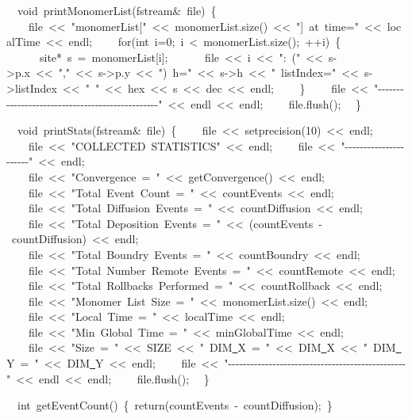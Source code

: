 {\ \ void\ printMonomerList(fstream\&\ file)\ \{
\ \ \ \ file\ <{}<{}\ "{}monomerList["{}\ <{}<{}\ monomerList.size()\ <{}<{}\ "{}]\ at\ time="{}\ <{}<{}\ localTime\ <{}<{}\ endl;
\ \ \ \ for(int\ i=0;\ i\ <{}\ monomerList.size();\ ++i)\ \{
\ \ \ \ \ \ site*\ s\ =\ monomerList[i];
\ \ \ \ \ \ file\ <{}<{}\ i\ <{}<{}\ "{}:\ ("{}\ <{}<{}\ s-{}>{}p.x\ <{}<{}\ "{},"{}\ <{}<{}\ s-{}>{}p.y\ <{}<{}\ "{})\ h="{}\ <{}<{}\ s-{}>{}h\ <{}<{}\ "{}\ listIndex="{}\ <{}<{}\ s-{}>{}listIndex\ <{}<{}\ "{}\ "{}\ <{}<{}\ hex\ <{}<{}\ s\ <{}<{}\ dec\ <{}<{}\ endl;
\ \ \ \ \}
\ \ \ \ file\ <{}<{}\ "{}-{}-{}-{}-{}-{}-{}-{}-{}-{}-{}-{}-{}-{}-{}-{}-{}-{}-{}-{}-{}-{}-{}-{}-{}-{}-{}-{}-{}-{}-{}-{}-{}-{}-{}-{}-{}-{}-{}-{}-{}-{}-{}-{}-{}-{}-{}-{}-{}"{}\ <{}<{}\ endl\ <{}<{}\ endl;
\ \ \ \ file.flush();
\ \ \}

\ \ void\ printStats(fstream\&\ file)\ \{
\ \ \ \ file\ <{}<{}\ setprecision(10)\ <{}<{}\ endl;
\ \ \ \ file\ <{}<{}\ "{}COLLECTED\ STATISTICS"{}\ <{}<{}\ endl;
\ \ \ \ file\ <{}<{}\ "{}-{}-{}-{}-{}-{}-{}-{}-{}-{}-{}-{}-{}-{}-{}-{}-{}-{}-{}-{}-{}-{}-{}"{}\ <{}<{}\ endl;
\ \ \ \ file\ <{}<{}\ "{}Convergence\ =\ "{}\ <{}<{}\ getConvergence()\ <{}<{}\ endl;
\ \ \ \ file\ <{}<{}\ "{}Total\ Event\ Count\ =\ "{}\ <{}<{}\ countEvents\ <{}<{}\ endl;
\ \ \ \ file\ <{}<{}\ "{}Total\ Diffusion\ Events\ =\ "{}\ <{}<{}\ countDiffusion\ <{}<{}\ endl;
\ \ \ \ file\ <{}<{}\ "{}Total\ Deposition\ Events\ =\ "{}\ <{}<{}\ (countEvents\ -{}\ countDiffusion)\ <{}<{}\ endl;
\ \ \ \ file\ <{}<{}\ "{}Total\ Boundry\ Events\ =\ "{}\ <{}<{}\ countBoundry\ <{}<{}\ endl;
\ \ \ \ file\ <{}<{}\ "{}Total\ Number\ Remote\ Events\ =\ "{}\ <{}<{}\ countRemote\ <{}<{}\ endl;
\ \ \ \ file\ <{}<{}\ "{}Total\ Rollbacks\ Performed\ =\ "{}\ <{}<{}\ countRollback\ <{}<{}\ endl;
\ \ \ \ file\ <{}<{}\ "{}Monomer\ List\ Size\ =\ "{}\ <{}<{}\ monomerList.size()\ <{}<{}\ endl;
\ \ \ \ file\ <{}<{}\ "{}Local\ Time\ =\ "{}\ <{}<{}\ localTime\ <{}<{}\ endl;
\ \ \ \ file\ <{}<{}\ "{}Min\ Global\ Time\ =\ "{}\ <{}<{}\ minGlobalTime\ <{}<{}\ endl;
\ \ \ \ file\ <{}<{}\ "{}Size\ =\ "{}\ <{}<{}\ SIZE\ <{}<{}\ "{}\ DIM\underline\ X\ =\ "{}\ <{}<{}\ DIM\underline\ X\ <{}<{}\ "{}\ DIM\underline\ Y\ =\ "{}\ <{}<{}\ DIM\underline\ Y\ <{}<{}\ endl;
\ \ \ \ file\ <{}<{}\ "{}-{}-{}-{}-{}-{}-{}-{}-{}-{}-{}-{}-{}-{}-{}-{}-{}-{}-{}-{}-{}-{}-{}-{}-{}-{}-{}-{}-{}-{}-{}-{}-{}-{}-{}-{}-{}-{}-{}-{}-{}-{}-{}-{}-{}-{}-{}-{}-{}"{}\ <{}<{}\ endl\ <{}<{}\ endl;
\ \ \ \ file.flush();
\ \ \}

\ \ int\ getEventCount()\ \{\ return(countEvents\ -{}\ countDiffusion);\ \}

}
